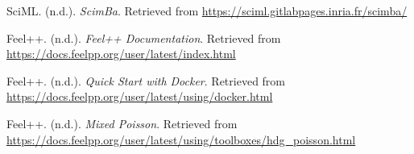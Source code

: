 \documentclass[12pt]{article}
\begin{document}
\begin{thebibliography}{14}
SciML. (n.d.). \textit{ScimBa}. Retrieved from \url{https://sciml.gitlabpages.inria.fr/scimba/}

Feel++. (n.d.). \textit{Feel++ Documentation}. Retrieved from \url{https://docs.feelpp.org/user/latest/index.html}

Feel++. (n.d.). \textit{Quick Start with Docker}. Retrieved from \url{https://docs.feelpp.org/user/latest/using/docker.html}

Feel++. (n.d.). \textit{Mixed Poisson}. Retrieved from \url{https://docs.feelpp.org/user/latest/using/toolboxes/hdg_poisson.html}

\end{thebibliography}
\end{document}
